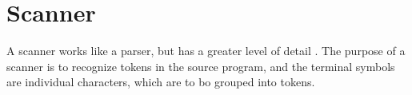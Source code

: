 \section{Scanner}
A scanner works like a parser, but has a greater level of detail \cite{misc:spo}. The purpose of a scanner is to recognize tokens in the source program, and the terminal symbols are individual characters, which are to bo grouped into tokens.\\

